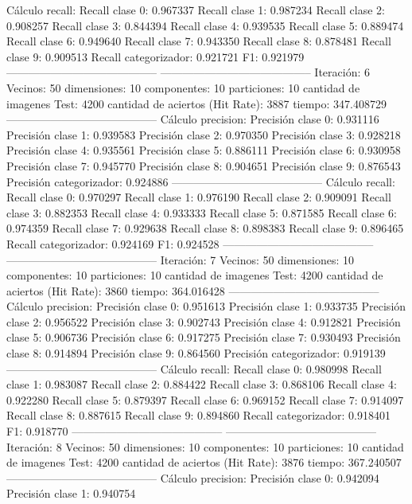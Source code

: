 Cálculo recall: 
Recall clase 0: 0.967337
Recall clase 1: 0.987234
Recall clase 2: 0.908257
Recall clase 3: 0.844394
Recall clase 4: 0.939535
Recall clase 5: 0.889474
Recall clase 6: 0.949640
Recall clase 7: 0.943350
Recall clase 8: 0.878481
Recall clase 9: 0.909513
Recall categorizador: 0.921721
F1: 0.921979
-----------------------------------------
-----------------------------------------
Iteración: 6
Vecinos: 50
dimensiones: 10
componentes: 10
particiones: 10
cantidad de imagenes Test: 4200
cantidad de aciertos (Hit Rate): 3887
tiempo: 347.408729
-----------------------------------------
Cálculo precision: 
Precisión clase 0: 0.931116
Precisión clase 1: 0.939583
Precisión clase 2: 0.970350
Precisión clase 3: 0.928218
Precisión clase 4: 0.935561
Precisión clase 5: 0.886111
Precisión clase 6: 0.930958
Precisión clase 7: 0.945770
Precisión clase 8: 0.904651
Precisión clase 9: 0.876543
Precisión categorizador: 0.924886
-----------------------------------------
Cálculo recall: 
Recall clase 0: 0.970297
Recall clase 1: 0.976190
Recall clase 2: 0.909091
Recall clase 3: 0.882353
Recall clase 4: 0.933333
Recall clase 5: 0.871585
Recall clase 6: 0.974359
Recall clase 7: 0.929638
Recall clase 8: 0.898383
Recall clase 9: 0.896465
Recall categorizador: 0.924169
F1: 0.924528
-----------------------------------------
-----------------------------------------
Iteración: 7
Vecinos: 50
dimensiones: 10
componentes: 10
particiones: 10
cantidad de imagenes Test: 4200
cantidad de aciertos (Hit Rate): 3860
tiempo: 364.016428
-----------------------------------------
Cálculo precision: 
Precisión clase 0: 0.951613
Precisión clase 1: 0.933735
Precisión clase 2: 0.956522
Precisión clase 3: 0.902743
Precisión clase 4: 0.912821
Precisión clase 5: 0.906736
Precisión clase 6: 0.917275
Precisión clase 7: 0.930493
Precisión clase 8: 0.914894
Precisión clase 9: 0.864560
Precisión categorizador: 0.919139
-----------------------------------------
Cálculo recall: 
Recall clase 0: 0.980998
Recall clase 1: 0.983087
Recall clase 2: 0.884422
Recall clase 3: 0.868106
Recall clase 4: 0.922280
Recall clase 5: 0.879397
Recall clase 6: 0.969152
Recall clase 7: 0.914097
Recall clase 8: 0.887615
Recall clase 9: 0.894860
Recall categorizador: 0.918401
F1: 0.918770
-----------------------------------------
-----------------------------------------
Iteración: 8
Vecinos: 50
dimensiones: 10
componentes: 10
particiones: 10
cantidad de imagenes Test: 4200
cantidad de aciertos (Hit Rate): 3876
tiempo: 367.240507
-----------------------------------------
Cálculo precision: 
Precisión clase 0: 0.942094
Precisión clase 1: 0.940754
